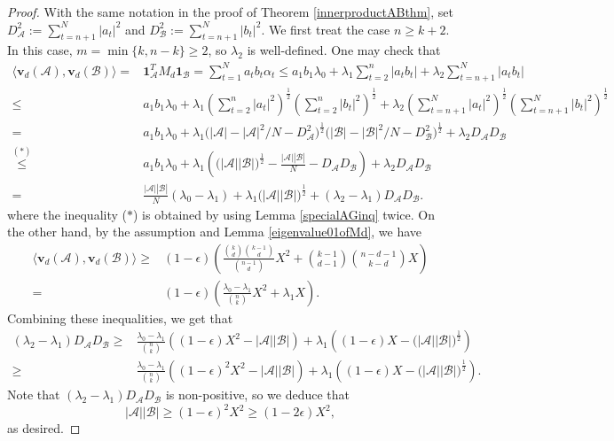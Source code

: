 \documentclass[11pt]{article}
\numberwithin{equation}{section}
\def\A{\mathcal{A}}
\def\B{\mathcal{B}}
\def\v{\mathbf{v}}
\def\1{\mathbf{1}}
\begin{document}
\begin{proof}
With the same notation in the proof of Theorem \ref{innerproductABthm}, set $D_\A^2:=\sum_{t=n+1}^N |a_t|^2$ and $D_\B^2:=\sum_{t=n+1}^N |b_t|^2$.
We first treat the case $n\geq k+2$.
In this case, $m=\min\{k,n-k\}\geq 2$, so $\lambda_2$ is well-defined.
One may check that
\begin{align*}
\big\langle \mathbf{v}_d(\A),\mathbf{v}_d(\B)\big\rangle
=&\1_\A^TM_d \1_\B
=   \sum_{t=1}^N a_t b_t \alpha_t
\leq    a_1 b_1 \lambda _0 + \lambda _1 \sum_{t=2}^n |a_t b_t |+ \lambda _2 \sum_{t=n+1}^N |a_t b_t |\\
\leq & a_1 b_1 \lambda _0 + \lambda _1\left(\sum_{t=2}^n |a_t|^2\right)^{\frac{1}{2}}
\left(\sum_{t=2}^n |b_t|^2\right)^{\frac{1}{2}}
+ \lambda _2\left(\sum_{t=n+1}^N |a_t|^2\right)^{\frac{1}{2}}
\left(\sum_{t=n+1}^N |b_t|^2\right)^{\frac{1}{2}}\\
= &a_1 b_1 \lambda _0 + \lambda _1\Big(|\A|-|\A|^2/ N -D_\A^2\Big)^{\frac{1}{2}}
\Big(|\B|-|\B|^2/ N -D_\B^2\Big)^{\frac{1}{2}}
+ \lambda _2D_\A D_\B\\
\overset{(\ast)}{\leq} & a_1 b_1 \lambda _0 + \lambda _1\left(\big(|\A||\B|\big)^{\frac{1}{2}}- \frac{|\A||\B|}{N}-D_\A D_\B\right)
+ \lambda _2D_\A D_\B\\
= & \frac{|\A||\B|}{N}\left(\lambda _0 - \lambda _1\right)+\lambda _1\big(|\A||\B|\big)^{\frac{1}{2}}
+\left(\lambda _2-\lambda _1\right)D_\A D_\B.
\end{align*}
where the inequality ($\ast$) is obtained by using Lemma \ref{specialAGinq} twice.
On the other hand, by the assumption and Lemma \ref{eigenvalue01ofMd}, we have
\begin{align*}
\big\langle\v_d(\A),\v_d(\B)\big\rangle
\geq& (1-\epsilon) \left(\frac{\binom{k}{d}\binom{k-1}{d}}{\binom{n-1}{d}} X^2
+\binom{k-1}{d-1} \binom{n-d-1}{k-d} X\right)\\
=&(1-\epsilon)\left( \frac{\lambda _0-\lambda _1}{ \binom{n}{k} } X^2
+\lambda _1  X\right).
\end{align*}
Combining these inequalities, we get that
\begin{align*}
\left(\lambda _2-\lambda _1\right)D_\A D_\B
\geq& \frac{\lambda _0-\lambda _1}{ \binom{n}{k} }
\left((1-\epsilon) X^2- |\A||\B|\right)
+\lambda _1 \left((1-\epsilon) X-\big(|\A||\B|\big)^{\frac{1}{2}}\right)\\
\geq& \frac{\lambda _0-\lambda _1}{ \binom{n}{k} }
\left((1-\epsilon)^2 X^2- |\A||\B|\right)
+\lambda _1 \left((1-\epsilon) X-\big(|\A||\B|\big)^{\frac{1}{2}}\right).
\end{align*}
Note that $\left(\lambda _2-\lambda _1\right)D_\A D_\B$ is non-positive,
so we deduce that
$$|\A||\B|\geq (1-\epsilon)^2X^2
\geq(1-2\epsilon) X^2,$$
as desired.


\end{proof}
\end{document}
